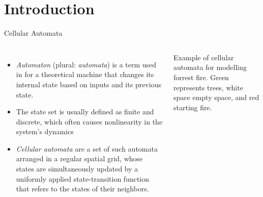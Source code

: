 \section{Introduction}
\begin{frame}{Cellular Automata}
     \small
\begin{columns}

     \begin{itemize}

    \item \textit{Automaton} (plural: \textit{automata}) is a term used in for a theoretical machine that changes its internal state based on inputs and its previous state. 

         \item The state set is usually defined as finite and discrete, which often causes nonlinearity in the system’s dynamics

     \item \textit{Cellular automata} are a set of such automata arranged in a regular spatial grid, whose states are simultaneously updated by a uniformly applied state-transition function that refers to the states of their neighbors.
     \end{itemize}
     \begin{center}

    Example of cellular automata for modelling forrest fire. Green represents trees, white space empty space, and red starting fire.
     \end{center}
     
\end{columns}
    

    


\end{frame}

